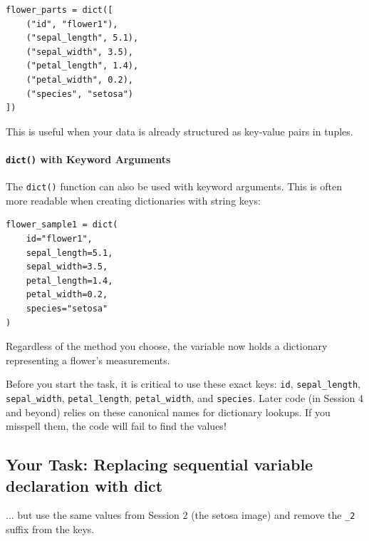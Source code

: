 \begin{verbatim}
flower_parts = dict([
    ("id", "flower1"),
    ("sepal_length", 5.1),
    ("sepal_width", 3.5),
    ("petal_length", 1.4),
    ("petal_width", 0.2),
    ("species", "setosa")
])
\end{verbatim}
This is useful when your data is already structured as key-value pairs in tuples.

\paragraph{\texttt{dict()} with Keyword Arguments}
The \texttt{dict()} function can also be used with keyword arguments. This is often more readable when creating dictionaries with string keys:

\begin{verbatim}
flower_sample1 = dict(
    id="flower1",
    sepal_length=5.1,
    sepal_width=3.5,
    petal_length=1.4,
    petal_width=0.2,
    species="setosa"
)
\end{verbatim}

Regardless of the method you choose, the variable now holds a dictionary representing a flower's measurements.

\begin{tcolorbox}[title=Canonical Keys are Important!]
Before you start the task, it is critical to use these exact keys: \texttt{id}, \texttt{sepal\_length}, \texttt{sepal\_width}, \texttt{petal\_length}, \texttt{petal\_width}, and \texttt{species}. Later code (in Session 4 and beyond) relies on these canonical names for dictionary lookups. If you misspell them, the code will fail to find the values!
\end{tcolorbox}





\subsection{Your Task: Replacing sequential variable declaration with dict}


\noindent
\begin{tcolorbox}[title=Task 1: Create A dictionary for second flower]
... but use the same values from Session 2 (the setosa image) and remove the \texttt{\_2} suffix from the keys.
\end{tcolorbox}


